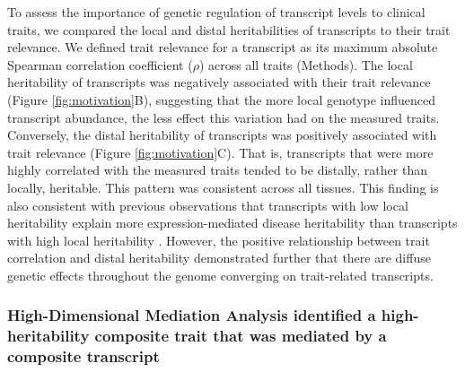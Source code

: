 \documentclass[
]{article}
\begin{document}
To assess the importance of genetic regulation of transcript levels to
clinical traits, we compared the local and distal heritabilities of
transcripts to their trait relevance. We defined trait relevance for a
transcript as its maximum absolute Spearman correlation coefficient
(\(\rho\)) across all traits (Methods). The local heritability of
transcripts was negatively associated with their trait relevance (Figure
\ref{fig:motivation}B), suggesting that the more local genotype
influenced transcript abundance, the less effect this variation had on
the measured traits. Conversely, the distal heritability of transcripts
was positively associated with trait relevance (Figure
\ref{fig:motivation}C). That is, transcripts that were more highly
correlated with the measured traits tended to be distally, rather than
locally, heritable. This pattern was consistent across all tissues. This
finding is also consistent with previous observations that transcripts
with low local heritability explain more expression-mediated disease
heritability than transcripts with high local heritability
\cite{pmid32424349}. However, the positive relationship between trait
correlation and distal heritability demonstrated further that there are
diffuse genetic effects throughout the genome converging on
trait-related transcripts.

\subsubsection{High-Dimensional Mediation Analysis identified a
high-heritability composite trait that was mediated by a composite
transcript}\label{high-dimensional-mediation-analysis-identified-a-high-heritability-composite-trait-that-was-mediated-by-a-composite-transcript}
\end{document}
